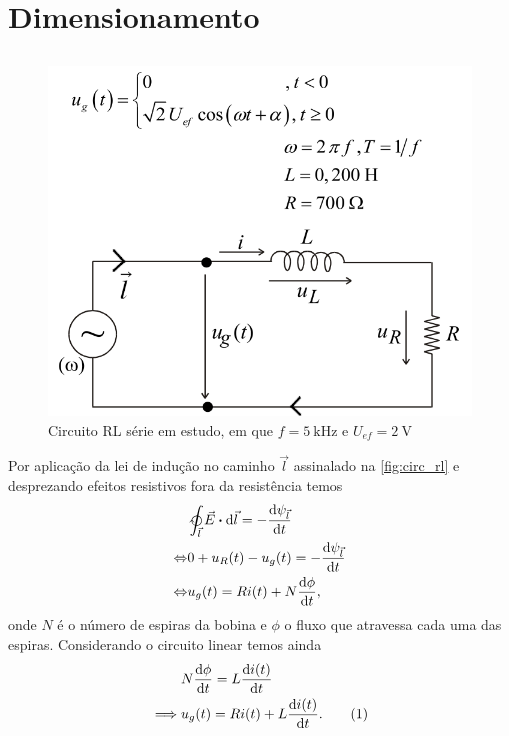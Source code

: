 \documentclass[a4paper, titlepage, portuguese]{article}
\newcommand{\eq}{\Leftrightarrow} %
\newcommand\numberthis{\addtocounter{equation}{1}\tag{\theequation}}
\begin{document}

	\section{Dimensionamento}
	\subsection{}
	\subsubsection{}
		\begin{figure}[H]
			\centering
			\includegraphics[width=0.7\linewidth]{rl.png}
			\caption{Circuito RL série em estudo, em que $f = \SI{5}{\kilo\hertz}$ e $U_{ef} = \SI{2}{\volt}$}
			\label{fig:circ_rl}
		\end{figure}
		\par
		Por aplicação da lei de indução no caminho $\vec{l}$ assinalado na \autoref{fig:circ_rl} e desprezando efeitos resistivos fora da resistência temos
		\begin{align*}
			&\ointclockwise_{\vec{l}} \vec{E} \vdot \dd{\vec{l}} = - \dv{\psi_{\vec{l}}}{t} \\ \eq
			&0 + u_R(t) - u_g(t) = - \dv{\psi_{\vec{l}}}{t} \\ \eq
			&u_g(t) = Ri(t) + N \dv{\phi}{t},
		\end{align*}
		onde $N$ é o número de espiras da bobina e $\phi$ o fluxo que atravessa cada uma das espiras. Considerando o circuito linear temos ainda
		\begin{align*}
			&N \dv{\phi}{t} = L \dv{i(t)}{t} \\ \implies
			&u_g(t) = Ri(t) + L \dv{i(t)}{t}. \numberthis \label{eq:trans_RL}
		\end{align*}
\end{document}
